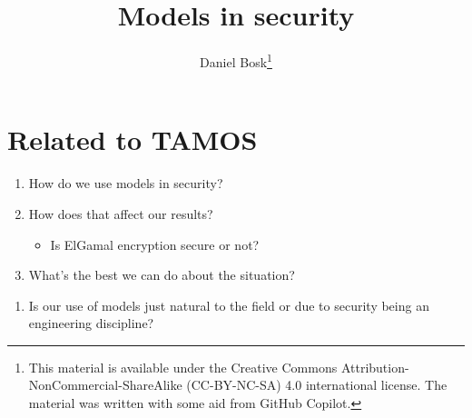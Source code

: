 \title{%
  Models in security
}
\author{Daniel Bosk\thanks{%
    This material is available under the Creative Commons 
    Attribution-NonCommercial-ShareAlike (CC-BY-NC-SA) 4.0 international 
    license.
    The material was written with some aid from GitHub Copilot.
}}

\begin{frame}
  \maketitle
\end{frame}

\mode*

\begin{abstract}
  
\end{abstract}

\clearpage

\section{Related to TAMOS}

\begin{frame}
  \begin{question}[Models]
    \begin{enumerate}
      \item How do we use models in security?
      \item How does that affect our results?
        \begin{itemize}
          \item Is ElGamal encryption secure or not?
        \end{itemize}
      \item What's the best we can do about the situation?
    \end{enumerate}
  \end{question}
\end{frame}

\begin{frame}
  \begin{question}
    \begin{enumerate}
      \item Is our use of models just natural to the field or due to security 
        being an engineering discipline?
    \end{enumerate}
  \end{question}
\end{frame}

